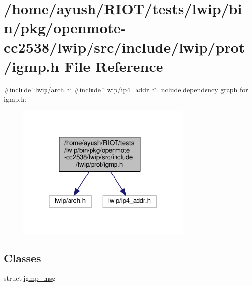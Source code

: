 \hypertarget{openmote-cc2538_2lwip_2src_2include_2lwip_2prot_2igmp_8h}{}\section{/home/ayush/\+R\+I\+O\+T/tests/lwip/bin/pkg/openmote-\/cc2538/lwip/src/include/lwip/prot/igmp.h File Reference}
\label{openmote-cc2538_2lwip_2src_2include_2lwip_2prot_2igmp_8h}
{\ttfamily \#include \char`\"{}lwip/arch.\+h\char`\"{}}\newline
{\ttfamily \#include \char`\"{}lwip/ip4\+\_\+addr.\+h\char`\"{}}\newline
Include dependency graph for igmp.\+h\+:
\nopagebreak
\begin{figure}[H]
\begin{center}
\leavevmode
\includegraphics[width=244pt]{openmote-cc2538_2lwip_2src_2include_2lwip_2prot_2igmp_8h__incl}
\end{center}
\end{figure}
\subsection*{Classes}
\begin{DoxyCompactItemize}
\item 
struct \hyperlink{structigmp__msg}{igmp\+\_\+msg}
\end{DoxyCompactItemize}
